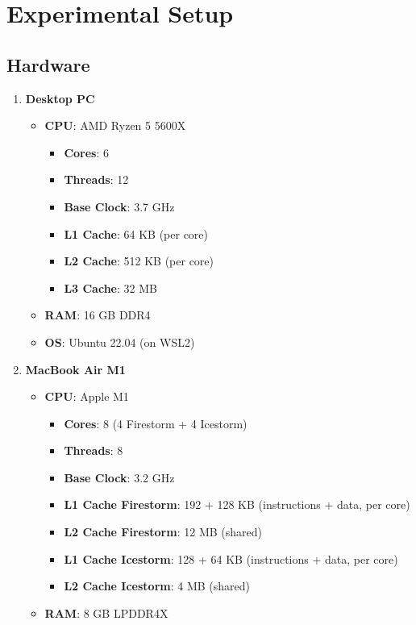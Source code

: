 \documentclass{article}
\begin{document}
\section{Experimental Setup}
\subsection{Hardware}
\begin{enumerate}
    \item \textbf{Desktop PC}
    \begin{itemize}
        \item \textbf{CPU}: AMD Ryzen 5 5600X
        \begin{itemize}
            \item \textbf{Cores}: 6
            \item \textbf{Threads}: 12
            \item \textbf{Base Clock}: 3.7 GHz
            \item \textbf{L1 Cache}: 64 KB (per core)
            \item \textbf{L2 Cache}: 512 KB (per core)
            \item \textbf{L3 Cache}: 32 MB
        \end{itemize}
        \item \textbf{RAM}: 16 GB DDR4
        \item \textbf{OS}: Ubuntu 22.04 (on WSL2)
    \end{itemize}
    \item \textbf{MacBook Air M1}
    \begin{itemize}
        \item \textbf{CPU}: Apple M1
        \begin{itemize}
            \item \textbf{Cores}: 8 (4 Firestorm + 4 Icestorm)
            \item \textbf{Threads}: 8
            \item \textbf{Base Clock}: 3.2 GHz
            \item \textbf{L1 Cache Firestorm}: 192 + 128 KB (instructions + data, per core)
            \item \textbf{L2 Cache Firestorm}: 12 MB (shared)
            \item \textbf{L1 Cache Icestorm}: 128 + 64 KB (instructions + data, per core)
            \item \textbf{L2 Cache Icestorm}: 4 MB (shared)
        \end{itemize}
        \item \textbf{RAM}: 8 GB LPDDR4X

\end{itemize}
\end{enumerate}
\end{document}

